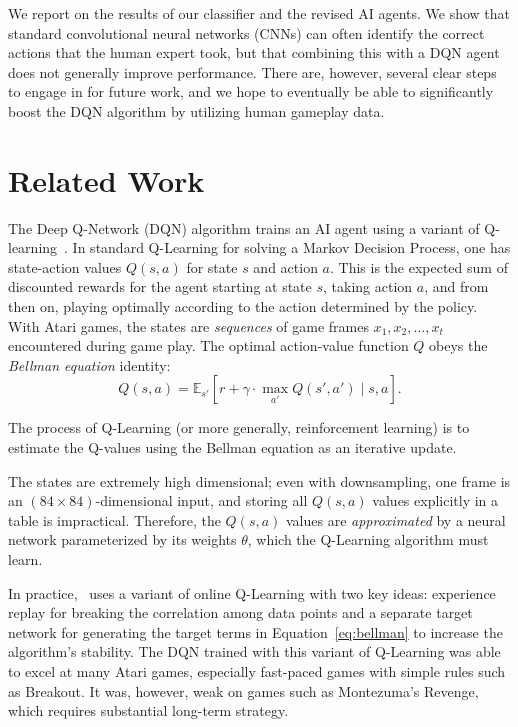 \documentclass[letterpaper, 10pt, conference]{ieeeconf}
\begin{document}
We report on the results of our classifier and the revised AI agents. We show
that standard convolutional neural networks (CNNs) can often identify the
correct actions that the human expert took, but that combining this with a DQN
agent does not generally improve performance. There are, however, several clear
steps to engage in for future work, and we hope to eventually be able to
significantly boost the DQN algorithm by utilizing human gameplay data.




\section{Related Work}\label{sec:related_work}

The Deep Q-Network (DQN) algorithm trains an AI agent using a variant of
Q-learning~\cite{Sutton_1998}. In standard Q-Learning for solving a Markov
Decision Process, one has state-action values $Q(s,a)$ for state $s$ and action
$a$. This is the expected sum of discounted rewards for the agent starting at
state $s$, taking action $a$, and from then on, playing optimally according to
the action determined by the policy.  With Atari games, the states are
\emph{sequences} of game frames $x_1,x_2,\ldots,x_t$ encountered during game
play. The optimal action-value function $Q$ obeys the \emph{Bellman equation}
identity: 
\begin{equation}\label{eq:bellman}
Q(s,a) = \mathbb{E}_{s'}\left[r + \gamma \cdot \max_{a'} Q(s',a') \mid s,a \right].
\end{equation}

The process of Q-Learning (or more generally, reinforcement learning) is to
estimate the Q-values using the Bellman equation as an iterative update.

The states are extremely high dimensional; even with downsampling, one frame is
an $(84\times 84)$-dimensional input, and storing all $Q(s,a)$ values explicitly
in a table is impractical.  Therefore, the $Q(s,a)$ values are
\emph{approximated} by a neural network parameterized by its weights $\theta$,
which the Q-Learning algorithm must learn.

In practice,~\cite{mnih-dqn-2015} uses a variant of online Q-Learning with two
key ideas: experience replay for breaking the correlation among data points and
a separate target network for generating the target terms in
Equation~\ref{eq:bellman} to increase the algorithm's stability. The DQN trained
with this variant of Q-Learning was able to excel at many Atari games,
especially fast-paced games with simple rules such as Breakout. It was, however,
weak on games such as Montezuma's Revenge, which requires substantial long-term
strategy.
\end{document}
